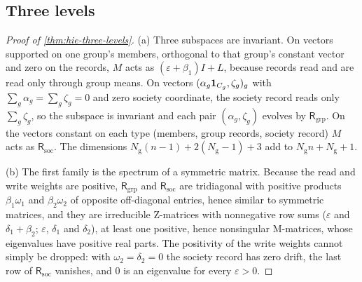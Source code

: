 \subsection*{Three levels}

\begin{proof}[Proof of \cref{thm:hie-three-levels}]
(a) Three subspaces are invariant. On vectors supported on one group's members, orthogonal to that group's constant vector and zero on the records, $M$ acts as $(\varepsilon+\beta_1)I+L$, because records read and are read only through group means. On vectors $(\alpha_g\mathbf{1}_{C_g},\zeta_g)_g$ with $\sum_g\alpha_g=\sum_g\zeta_g=0$ and zero society coordinate, the society record reads only $\sum_g\zeta_g$, so the subspace is invariant and each pair $(\alpha_g,\zeta_g)$ evolves by $\mathsf R_{\mathrm{grp}}$. On the vectors constant on each type (members, group records, society record) $M$ acts as $\mathsf R_{\mathrm{soc}}$. The dimensions $N_{\mathrm g}(n-1)+2(N_{\mathrm g}-1)+3$ add to $N_{\mathrm g}n+N_{\mathrm g}+1$.

(b) The first family is the spectrum of a symmetric matrix. Because the read and write weights are positive, $\mathsf R_{\mathrm{grp}}$ and $\mathsf R_{\mathrm{soc}}$ are tridiagonal with positive products $\beta_1\omega_1$ and $\beta_2\omega_2$ of opposite off-diagonal entries, hence similar to symmetric matrices, and they are irreducible Z-matrices with nonnegative row sums ($\varepsilon$ and $\delta_1+\beta_2$; $\varepsilon$, $\delta_1$ and $\delta_2$), at least one positive, hence nonsingular M-matrices, whose eigenvalues have positive real parts. The positivity of the write weights cannot simply be dropped: with $\omega_2=\delta_2=0$ the society record has zero drift, the last row of $\mathsf R_{\mathrm{soc}}$ vanishes, and $0$ is an eigenvalue for every $\varepsilon>0$.


\end{proof}
